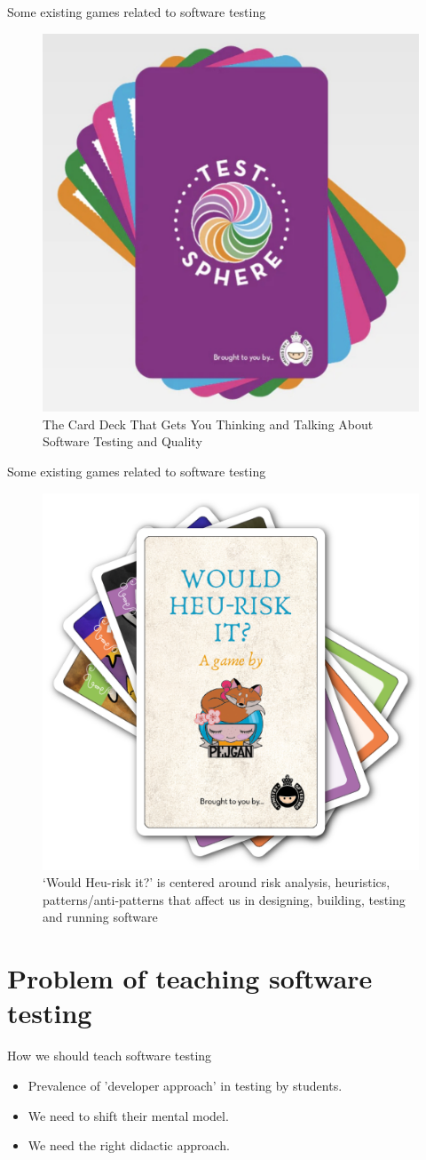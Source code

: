 \documentclass[aspectratio=169]{beamer}
\begin{document}
\begin{frame}{Some existing games related to software testing}
\begin{figure}
    \centering
    \includegraphics[width=0.5\linewidth]{images//games/testsphere}
    \caption{The Card Deck That Gets You Thinking and Talking About Software Testing and Quality}
\end{figure}
\end{frame}

\begin{frame}{Some existing games related to software testing}
\begin{figure}
    \centering
    \includegraphics[width=0.5\linewidth]{images//games/would}
    \caption{`Would Heu-risk it?' is centered around risk analysis, heuristics, patterns/anti-patterns that affect us in designing, building, testing and running software}
\end{figure}
\end{frame}

\section{Problem of teaching software testing}

\begin{frame}{How we should teach software testing}
    \begin{itemize}
        \item Prevalence of 'developer approach' in testing by students.
        \item We need to shift their mental model.
        \item We need the right didactic approach.
    \end{itemize}
\end{frame}
\end{document}

